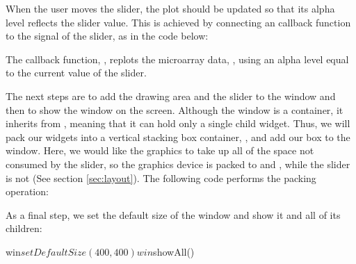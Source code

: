 \documentclass[article,shortnames]{jss}
\begin{document}
When the user moves the slider, the plot should be updated so that its
alpha level reflects the slider value. This is achieved by connecting
an  callback function to the  signal
of the slider, as in the code below:
The callback function, , replots the
microarray data, , using an alpha level equal to the
current value of the slider.

The next steps are to add the drawing area and the slider to the
window and then to show the window on the screen. Although the window
is a container, it inherits from , meaning that it can
hold only a single child widget. Thus, we will pack our widgets into a
vertical stacking box container, , and add our box to
the window.  Here, we would like the graphics to take up all of the
space not consumed by the slider, so the graphics device is packed to
 and , while the slider is not
(See section \ref{sec:layout}). The following code performs the
packing operation:

As a final step, we set the default size of the window and show it and
all of its children:
\begin{Code}
win$setDefaultSize(400,400)
win$showAll() 
\end{Code}
\end{document}

